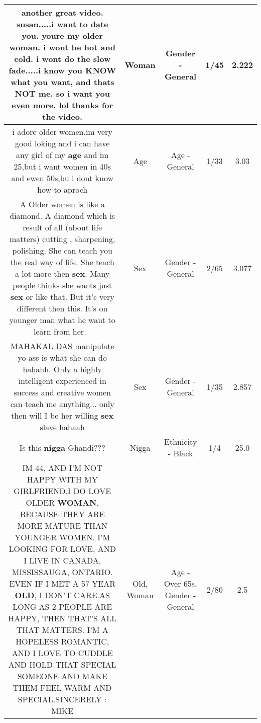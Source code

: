 \documentclass[11pt]{article}
\newlength\mylength
\begin{document}
\begin{center}
\begin{longtable}{|C{.65\mylength}|C{.30\mylength}|C{.12\mylength}|C{.12\mylength}|C{.12\mylength}|}
  \small another great video. susan.....i want to date you. youre my older \textbf{woman}. i wont be hot and cold. i wont do the slow fade.....i know you KNOW what you want, and thats NOT me. so i want you even more. lol thanks for the video.\normalsize   & Woman & Gender - General & 1/45 & 2.222 \\  \hline
  \small i adore  older women,im very good loking and i  can have any girl of my \textbf{age} and im 25,but i want  women in 40s and ewen 50s,bu i dont  know how to aproch\normalsize   & Age & Age - General & 1/33 & 3.03 \\  \hline
  \small A Older women is like a diamond. A diamond which is result of all (about life matters) cutting , sharpening, polishing. She can teach you the real way of life. She teach a lot more then \textbf{sex}. Many people thinks she wants just \textbf{sex} or like that. But it's very different then this. It's on younger man what he want to learn from her. 🙏\normalsize   & Sex & Gender - General & 2/65 & 3.077 \\  \hline
  \small MAHAKAL DAS manipulate yo ass is what she can do hahahh. Only a highly intelligent experienced in success and creative women can teach me anything... only then will I be her willing \textbf{sex} slave hahaah\normalsize   & Sex & Gender - General & 1/35 & 2.857 \\  \hline
  \small Is this \textbf{nigga} Ghandi???\normalsize   & Nigga & Ethnicity - Black & 1/4 & 25.0 \\  \hline
  \small IM 44, AND I'M NOT HAPPY WITH MY GIRLFRIEND.I DO LOVE OLDER \textbf{WOMAN}, BECAUSE THEY ARE MORE MATURE THAN YOUNGER WOMEN. I'M LOOKING FOR LOVE, AND I LIVE IN CANADA, MISSISSAUGA, ONTARIO. EVEN IF I MET A 57 YEAR \textbf{OLD}, I DON'T CARE.AS LONG AS 2 PEOPLE ARE HAPPY, THEN THAT'S ALL THAT MATTERS. I'M A HOPELESS ROMANTIC, AND I LOVE TO CUDDLE AND HOLD THAT SPECIAL SOMEONE AND MAKE THEM FEEL WARM AND SPECIAL.SINCERELY : MIKE\normalsize   & Old, Woman & Age - Over 65s, Gender - General & 2/80 & 2.5 \\  \hline

\end{longtable}
\end{center}
\end{document}
